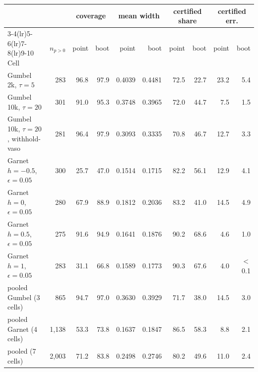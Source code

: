 \begin{tabular}{lrrrrrrrrr}
\toprule
 & & \multicolumn{2}{c}{coverage} & \multicolumn{2}{c}{mean width} & \multicolumn{2}{c}{certified share} & \multicolumn{2}{c}{certified err.} \\
\cmidrule(lr){3-4}\cmidrule(lr){5-6}\cmidrule(lr){7-8}\cmidrule(lr){9-10}
Cell & $n_{p>0}$ & point & boot & point & boot & point & boot & point & boot \\
\midrule
Gumbel 2k, $\tau{=}5$ & 283 & 96.8 & 97.9 & 0.4039 & 0.4481 & 72.5 & 22.7 & 23.2 & 5.4 \\
Gumbel 10k, $\tau{=}20$ & 301 & 91.0 & 95.3 & 0.3748 & 0.3965 & 72.0 & 44.7 & 7.5 & 1.5 \\
Gumbel 10k, $\tau{=}20$, withhold-vaso & 281 & 96.4 & 97.9 & 0.3093 & 0.3335 & 70.8 & 46.7 & 12.7 & 3.3 \\
Garnet $h{=}{-}0.5$, $\epsilon{=}0.05$ & 300 & 25.7 & 47.0 & 0.1514 & 0.1715 & 82.2 & 56.1 & 12.9 & 4.1 \\
Garnet $h{=}0$, $\epsilon{=}0.05$ & 280 & 67.9 & 88.9 & 0.1812 & 0.2036 & 83.2 & 41.0 & 14.5 & 4.9 \\
Garnet $h{=}0.5$, $\epsilon{=}0.05$ & 275 & 91.6 & 94.9 & 0.1641 & 0.1876 & 90.2 & 68.6 & 4.6 & 1.0 \\
Garnet $h{=}1$, $\epsilon{=}0.05$ & 283 & 31.1 & 66.8 & 0.1589 & 0.1773 & 90.3 & 67.6 & 4.0 & $<$0.1 \\
\midrule
pooled Gumbel (3 cells) & 865 & 94.7 & 97.0 & 0.3630 & 0.3929 & 71.7 & 38.0 & 14.5 & 3.0 \\
pooled Garnet (4 cells) & 1,138 & 53.3 & 73.8 & 0.1637 & 0.1847 & 86.5 & 58.3 & 8.8 & 2.1 \\
pooled (7 cells) & 2,003 & 71.2 & 83.8 & 0.2498 & 0.2746 & 80.2 & 49.6 & 11.0 & 2.4 \\
\bottomrule
\end{tabular}
